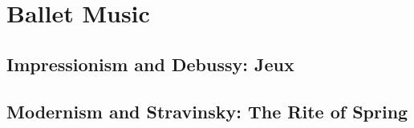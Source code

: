 
\chapter{Ballet Music}
\label{balletmusic}


\section{Impressionism and Debussy: Jeux}

\section{Modernism and Stravinsky: The Rite of Spring}

